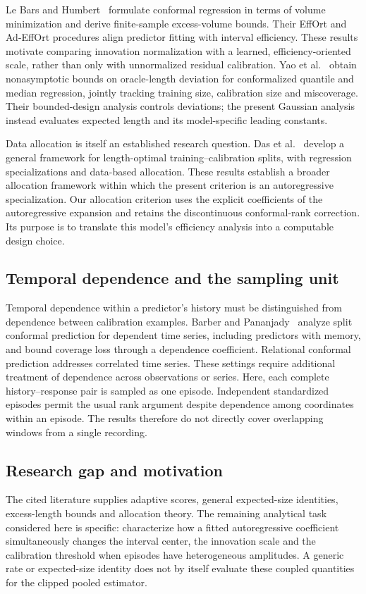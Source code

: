 \documentclass[nolineno]{ieeeaccess}
\begin{document}
Le Bars and Humbert~\cite{bars2025} formulate conformal regression in terms of volume minimization and derive finite-sample excess-volume bounds. Their EffOrt and Ad-EffOrt procedures align predictor fitting with interval efficiency. These results motivate comparing innovation normalization with a learned, efficiency-oriented scale, rather than only with unnormalized residual calibration. Yao et al.~\cite{yao2026} obtain nonasymptotic bounds on oracle-length deviation for conformalized quantile and median regression, jointly tracking training size, calibration size and miscoverage. Their bounded-design analysis controls deviations; the present Gaussian analysis instead evaluates expected length and its model-specific leading constants.

Data allocation is itself an established research question. Das et al.~\cite{das2026} develop a general framework for length-optimal training--calibration splits, with regression specializations and data-based allocation. These results establish a broader allocation framework within which the present criterion is an autoregressive specialization. Our allocation criterion uses the explicit coefficients of the autoregressive expansion and retains the discontinuous conformal-rank correction. Its purpose is to translate this model's efficiency analysis into a computable design choice.

\subsection{Temporal dependence and the sampling unit}
Temporal dependence within a predictor's history must be distinguished from dependence between calibration examples. Barber and Pananjady~\cite{barber2026} analyze split conformal prediction for dependent time series, including predictors with memory, and bound coverage loss through a dependence coefficient. Relational conformal prediction \cite{cini2025} addresses correlated time series. These settings require additional treatment of dependence across observations or series. Here, each complete history--response pair is sampled as one episode. Independent standardized episodes permit the usual rank argument despite dependence among coordinates within an episode. The results therefore do not directly cover overlapping windows from a single recording.

\subsection{Research gap and motivation}
The cited literature supplies adaptive scores, general expected-size identities, excess-length bounds and allocation theory. The remaining analytical task considered here is specific: characterize how a fitted autoregressive coefficient simultaneously changes the interval center, the innovation scale and the calibration threshold when episodes have heterogeneous amplitudes. A generic rate or expected-size identity does not by itself evaluate these coupled quantities for the clipped pooled estimator.
\end{document}
